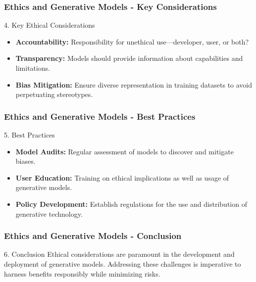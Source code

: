 \documentclass[aspectratio=169]{beamer}
\begin{document}
\begin{frame}[fragile]
    \frametitle{Ethics and Generative Models - Key Considerations}
    \begin{block}{4. Key Ethical Considerations}
        \begin{itemize}
            \item \textbf{Accountability:} Responsibility for unethical use—developer, user, or both?
            \item \textbf{Transparency:} Models should provide information about capabilities and limitations.
            \item \textbf{Bias Mitigation:} Ensure diverse representation in training datasets to avoid perpetuating stereotypes.
        \end{itemize}
    \end{block}
\end{frame}

\begin{frame}[fragile]
    \frametitle{Ethics and Generative Models - Best Practices}
    \begin{block}{5. Best Practices}
        \begin{itemize}
            \item \textbf{Model Audits:} Regular assessment of models to discover and mitigate biases.
            \item \textbf{User Education:} Training on ethical implications as well as usage of generative models.
            \item \textbf{Policy Development:} Establish regulations for the use and distribution of generative technology.
        \end{itemize}
    \end{block}
\end{frame}

\begin{frame}[fragile]
    \frametitle{Ethics and Generative Models - Conclusion}
    \begin{block}{6. Conclusion}
        Ethical considerations are paramount in the development and deployment of generative models. Addressing these challenges is imperative to harness benefits responsibly while minimizing risks.
    \end{block}
\end{frame}
\end{document}
